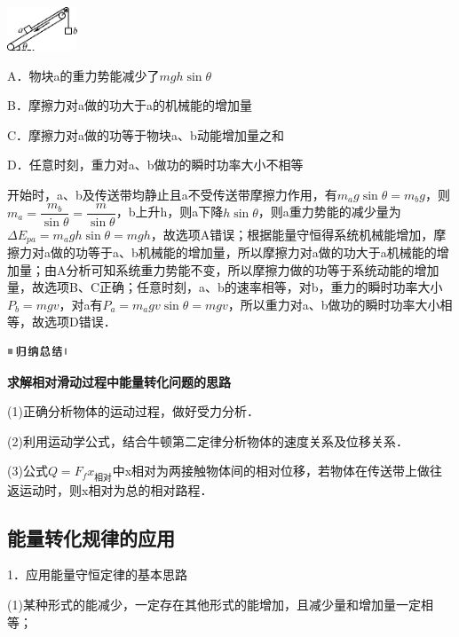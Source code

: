 \documentclass[cn,10.5pt,chinese,mac,chinesefont=founder]{elegantbook}
\begin{document}
\begin{center}\includegraphics[width=0.82083in,height=0.50972in]{media/image241.png}\end{center}

A．物块a的重力势能减少了$mgh\sin \theta$

B．摩擦力对a做的功大于a的机械能的增加量

C．摩擦力对a做的功等于物块a、b动能增加量之和

D．任意时刻，重力对a、b做功的瞬时功率大小不相等
\begin{solution}
	开始时，a、b及传送带均静止且a不受传送带摩擦力作用，有$m_ag\sin\theta=m_bg$，则$m_{a}=\dfrac{m_{b}}{\sin \theta}=\dfrac{m}{\sin \theta}$，b上升h，则a下降$h\sin\theta$，则a重力势能的减少量为$\Delta E_{pa}=m_agh\sin\theta=mgh$，故选项A错误；根据能量守恒得系统机械能增加，摩擦力对a做的功等于a、b机械能的增加量，所以摩擦力对a做的功大于a机械能的增加量；由A分析可知系统重力势能不变，所以摩擦力做的功等于系统动能的增加量，故选项B、C正确；任意时刻，a、b的速率相等，对b，重力的瞬时功率大小$P_b=mgv$，对a有$P_a=m_agv\sin\theta=mgv$，所以重力对a、b做功的瞬时功率大小相等，故选项D错误．
\end{solution}


\begin{center}\includegraphics[width=0.70764in,height=0.12292in]{media/image13.png}

\textbf{求解相对滑动过程中能量转化问题的思路}
\end{center}


(1)正确分析物体的运动过程，做好受力分析．

(2)利用运动学公式，结合牛顿第二定律分析物体的速度关系及位移关系．

(3)公式$Q=F_fx_{\text{相对}}$中x相对为两接触物体间的相对位移，若物体在传送带上做往返运动时，则x相对为总的相对路程．

\newpage
\subsection{能量转化规律的应用}

1．应用能量守恒定律的基本思路

(1)某种形式的能减少，一定存在其他形式的能增加，且减少量和增加量一定相等；
\end{document}
